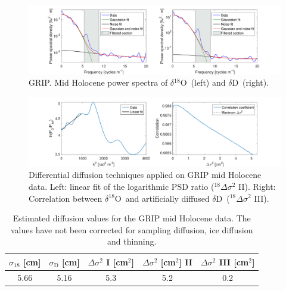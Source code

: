 \documentclass[11pt, draftcls, onecolumn]{IEEEtran} %
\numberwithin{equation}{section}
\numberwithin{table}{section}
\numberwithin{figure}{section}
\newcommand{\delOx}{$\delta{}^{18}\mathrm{O}$}
\newcommand{\delD}{$\delta\mathrm{D}$}
\begin{document}
\begin{appendices}
\begin{figure}[H]
	\vspace*{2mm}
	\begin{center}
		\includegraphics[width=1\textwidth]{Figure_37}
		\caption{GRIP. Mid Holocene power spectra of \delOx~(left) and \delD~(right).}  \label{fig:GRIP_mid_fig_1}
	\end{center}
\end{figure}

\begin{figure}[H]
	\vspace*{2mm}
	\begin{center}
		\includegraphics[width=1\textwidth]{Figure_38}
		\caption{Differential diffusion techniques applied on GRIP mid Holocene data. 
			Left: linear fit of the logarithmic PSD ratio ($^{18}\Delta\sigma^2$ II). Right: 
			Correlation between \delOx~and artificially diffused \delD~($^{18}\Delta\sigma^2$ III).}  \label{fig:GRIP_mid_fig_2}
	\end{center}
\end{figure}

\begin{table}[H]
	\center
	\caption{Estimated diffusion values for the GRIP mid Holocene data.
		The values have not been corrected for sampling diffusion, ice diffusion and thinning.}
	\label{GRIP_mid_holo}
	\begin{tabular}{c c c c c} 
		\toprule
		$\sigma_{18}$ [cm] & $\sigma_\mathrm{D}$ [cm] & $\Delta\sigma^2$ I [cm$^2$] & $\Delta\sigma^2$ [cm$^2$] II & $\Delta\sigma^2$ III [cm$^2$] \\
		\midrule
		5.66 &   5.16 &     5.3 &     5.2 &     0.2 \\
		\bottomrule		
	\end{tabular}
\end{table}


\end{appendices}
\end{document}
